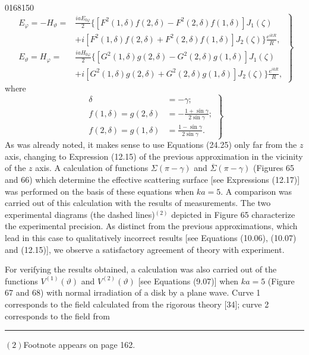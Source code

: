 \begin{scanpage}{0168}{150}
\[
\left.\begin{aligned}E_\varphi=-H_\vartheta={}&\frac{iaE_{0\varphi}}2\bigl\{[F^2(1,\delta)f(2,\delta)-F^2(2,\delta)f(1,\delta)]J_1(\zeta)\\&+i[F^2(1,\delta)f(2,\delta)+F^2(2,\delta)f(1,\delta)]J_2(\zeta)\bigr\}\frac{e^{ikR}}R,\\
E_\vartheta=H_\varphi={}&\frac{iaH_{0\varphi}}2\bigl\{[G^2(1,\delta)g(2,\delta)-G^2(2,\delta)g(1,\delta)]J_1(\zeta)\\&+i[G^2(1,\delta)g(2,\delta)+G^2(2,\delta)g(1,\delta)]J_2(\zeta)\bigr\}\frac{e^{ikR}}R,
\end{aligned}\right\}\tag{24.25}
\]
where
\[
\left.\begin{aligned}\delta&=-\gamma;\\
f(1,\delta)=g(2,\delta)&=-\frac{1+\sin\gamma}{2\sin\gamma};\\
f(2,\delta)=g(1,\delta)&=\frac{1-\sin\gamma}{2\sin\gamma}.
\end{aligned}\right\}\tag{24.26}
\]
As was already noted, it makes sense to use Equations (24.25) only far from the $z$ axis, changing to Expression (12.15) of the previous approximation in the vicinity of the $z$ axis. A calculation of functions $\Sigma(\pi-\gamma)$ and $\overline\Sigma(\pi-\gamma)$ (Figures 65 and 66) which determine the effective scattering surface [see Expressions (12.17)] was performed on the basis of these equations when $ka=5$. A comparison was carried out of this calculation with the results of measurements. The two experimental diagrams (the dashed lines)$^{(2)}$ depicted in Figure 65 characterize the experimental precision. As distinct from the previous approximations, which lead in this case to qualitatively incorrect results [see Equations (10.06), (10.07) and (12.15)], we observe a satisfactory agreement of theory with experiment.

For verifying the results obtained, a calculation was also carried out of the functions $V^{(1)}(\vartheta)$ and $V^{(2)}(\vartheta)$ [see Equations (9.07)] when $ka=5$ (Figure 67 and 68) with normal irradiation of a disk by a plane wave. Curve 1 corresponds to the field calculated from the rigorous theory [34]; curve 2 corresponds to the field from
\par\bigskip\hrule\smallskip
$(2)$Footnote appears on page 162.
\end{scanpage}
